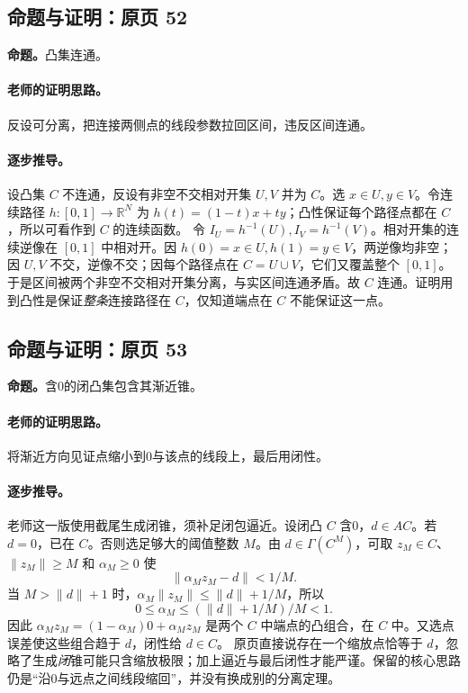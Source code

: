 \documentclass[11pt,a4paper]{article}
\newcommand{\R}{\mathbb{R}}\newcommand{\N}{\mathbb{N}}
\theoremstyle{definition}\newtheorem{definition}{定义}\newtheorem{example}{例}
\begin{document}
\subsection{命题与证明：原页 52}

\textbf{命题。}凸集连通。

\paragraph{老师的证明思路。}反设可分离，把连接两侧点的线段参数拉回区间，违反区间连通。

\paragraph{逐步推导。}
设凸集 $C$ 不连通，反设有非空不交相对开集 $U,V$ 并为 $C$。选 $x\in U,y\in V$。令连续路径 $h:[0,1]\to\R^N$ 为 $h(t)=(1-t)x+ty$；凸性保证每个路径点都在 $C$，所以可看作到 $C$ 的连续函数。
令 $I_U=h^{-1}(U),I_V=h^{-1}(V)$。相对开集的连续逆像在 $[0,1]$ 中相对开。因 $h(0)=x\in U,h(1)=y\in V$，两逆像均非空；因 $U,V$ 不交，逆像不交；因每个路径点在 $C=U\cup V$，它们又覆盖整个 $[0,1]$。
于是区间被两个非空不交相对开集分离，与实区间连通矛盾。故 $C$ 连通。证明用到凸性是保证\emph{整条}连接路径在 $C$，仅知道端点在 $C$ 不能保证这一点。


\subsection{命题与证明：原页 53}

\textbf{命题。}含0的闭凸集包含其渐近锥。

\paragraph{老师的证明思路。}将渐近方向见证点缩小到0与该点的线段上，最后用闭性。

\paragraph{逐步推导。}
老师这一版使用截尾生成闭锥，须补足闭包逼近。设闭凸 $C$ 含0，$d\in AC$。若 $d=0$，已在 $C$。否则选足够大的阈值整数 $M$。由 $d\in\Gamma(C^M)$，可取 $z_M\in C$、$\|z_M\|\ge M$ 和 $\alpha_M\ge0$ 使
\[\|\alpha_Mz_M-d\|<1/M.\]
当 $M>\|d\|+1$ 时，$\alpha_M\|z_M\|\le\|d\|+1/M$，所以
\[0\le\alpha_M\le(\|d\|+1/M)/M<1.\]
因此 $\alpha_Mz_M=(1-\alpha_M)0+\alpha_Mz_M$ 是两个 $C$ 中端点的凸组合，在 $C$ 中。又选点误差使这些组合趋于 $d$，闭性给 $d\in C$。
原页直接说存在一个缩放点恰等于 $d$，忽略了生成\emph{闭}锥可能只含缩放极限；加上逼近与最后闭性才能严谨。保留的核心思路仍是“沿0与远点之间线段缩回”，并没有换成别的分离定理。
\end{document}
